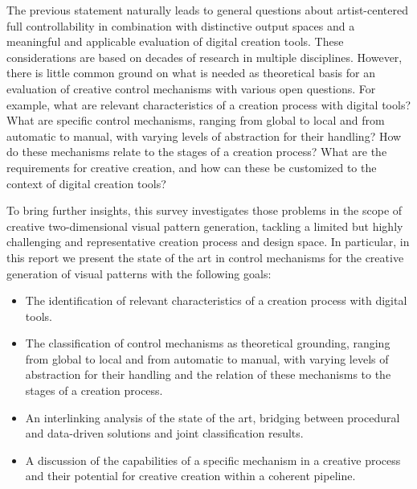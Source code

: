 The previous statement naturally leads to general questions about artist-centered full controllability in combination with distinctive output spaces and a meaningful and applicable evaluation of digital creation tools. These considerations are based on decades of research in multiple disciplines. However, there is little common ground on what is needed as theoretical basis for an evaluation of creative control mechanisms with various open questions. For example, what are relevant characteristics of a creation process with digital tools? What are specific control mechanisms, ranging from global to local and from automatic to manual, with varying levels of abstraction for their handling? How do these mechanisms relate to the stages of a creation process? What are the requirements for creative creation, and how can these be customized to the context of digital creation tools?

To bring further insights, this survey investigates those problems in the scope of creative two-dimensional visual pattern generation, tackling a limited but highly challenging and representative creation process and design space. In particular, in this report we present the state of the art in control mechanisms for the creative generation of visual patterns with the following goals:


\begin{itemize}
    \item The identification of relevant characteristics of a creation process with digital tools.
    \item The classification of control mechanisms as theoretical grounding, ranging from global to local and from automatic to manual, with varying levels of abstraction for their handling and the relation of these mechanisms to the stages of a creation process. 
    \item An interlinking analysis of the state of the art, bridging between procedural and data-driven solutions and joint classification results. 
    \item A discussion of the capabilities of a specific mechanism in a creative process and their potential for creative creation within a coherent pipeline.
\end{itemize}



